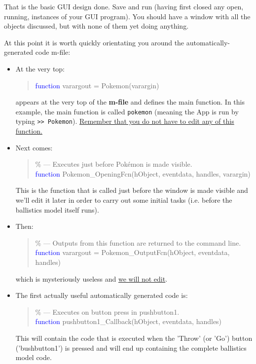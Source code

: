 \documentclass{tufte-book} %
\newenvironment{docspec}{\begin{quotation}\ttfamily\parskip0pt\parindent0pt\ignorespaces}{\end{quotation}}
\begin{document}
That is the basic GUI design done. Save and run (having first closed any open, running, instances of your GUI program). You should have a window with all the objects discussed, but with none of them yet doing anything.

At this point it is worth quickly orientating you around the automatically-generated code \textsf{m-file}:

\begin{itemize}[noitemsep]
\setlength{\itemindent}{.3in}
\item At the very top:
\begin{docspec}
\textcolor{blue}{function} varargout = Pokemon(varargin)
\end{docspec}
appears at the very top of the \textbf{m-file} and defines the main function. In this example, the main function is called \texttt{pokemon} (meaning the App is run by typing \texttt{>> Pokemon}). \uline{Remember that you do not have to edit any of this function.}
\item Next comes:
\begin{docspec}
\textcolor[rgb]{0,0.501961,0}{\% --- Executes just before Pok\'emon is made visible.}
\\\textcolor{blue}{function} Pokemon\_OpeningFcn(hObject, eventdata, handles, varargin)
\end{docspec}
This is the function that is called just before the window is made visible and we'll edit it later in order to carry out some initial tasks (i.e. before the ballistics model itself runs).
\item Then:
\begin{docspec}
\textcolor[rgb]{0,0.501961,0}{\% --- Outputs from this function are returned to the command line.}
\\\textcolor{blue}{function} varargout = Pokemon\_OutputFcn(hObject, eventdata, handles)
\end{docspec} 
which is mysteriously useless and \uline{we will not edit}.
\item The first actually useful automatically generated code is:
\begin{docspec}
\textcolor[rgb]{0,0.501961,0}{\% --- Executes on button press in pushbutton1.}
\\\textcolor{blue}{function} pushbutton1\_Callback(hObject, eventdata, handles)
\end{docspec} 
This will contain the code that is executed when the 'Throw' (or 'Go') button ('\textsf{bushbutton1}') is pressed and will end up containing the complete ballistics model code.

\end{itemize}
\end{document}
